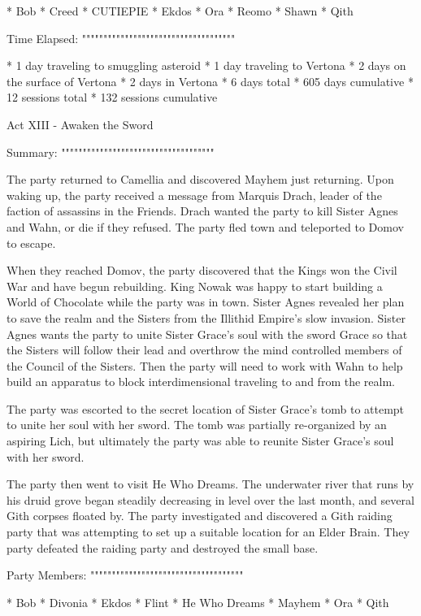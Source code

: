   * Bob
  * Creed
  * CUTIEPIE
  * Ekdos
  * Ora
  * Reomo
  * Shawn
  * Qith

Time Elapsed:
""""""""""""""""""""""""""""""""""""

  * 1 day traveling to smuggling asteroid
  * 1 day traveling to Vertona
  * 2 days on the surface of Vertona
  * 2 days in Vertona
  * 6 days total
  * 605 days cumulative
  * 12 sessions total
  * 132 sessions cumulative

Act XIII - Awaken the Sword
^^^^^^^^^^^^^^^^^^^^^^^^^^^^^^^^^^^^

Summary:
""""""""""""""""""""""""""""""""""""

The party returned to Camellia and discovered Mayhem just returning.
Upon waking up, the party received a message from Marquis Drach, leader of the faction of assassins in the Friends.
Drach wanted the party to kill Sister Agnes and Wahn, or die if they refused.
The party fled town and teleported to Domov to escape.

When they reached Domov, the party discovered that the Kings won the Civil War and have begun rebuilding.
King Nowak was happy to start building a World of Chocolate while the party was in town.
Sister Agnes revealed her plan to save the realm and the Sisters from the Illithid Empire's slow invasion.
Sister Agnes wants the party to unite Sister Grace's soul with the sword Grace so that the Sisters will follow their lead and overthrow the mind controlled members of the Council of the Sisters.
Then the party will need to work with Wahn to help build an apparatus to block interdimensional traveling to and from the realm.

The party was escorted to the secret location of Sister Grace's tomb to attempt to unite her soul with her sword.
The tomb was partially re-organized by an aspiring Lich, but ultimately the party was able to reunite Sister Grace's soul with her sword.

The party then went to visit He Who Dreams.
The underwater river that runs by his druid grove began steadily decreasing in level over the last month, and several Gith corpses floated by.
The party investigated and discovered a Gith raiding party that was attempting to set up a suitable location for an Elder Brain.
They party defeated the raiding party and destroyed the small base.

Party Members:
""""""""""""""""""""""""""""""""""""

  * Bob
  * Divonia
  * Ekdos
  * Flint
  * He Who Dreams
  * Mayhem
  * Ora
  * Qith


